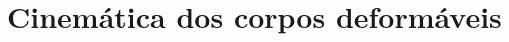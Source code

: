 \documentclass[tese_patricia]{subfiles}
\begin{document}

\section{Cinemática dos corpos deformáveis}
\end{document}
